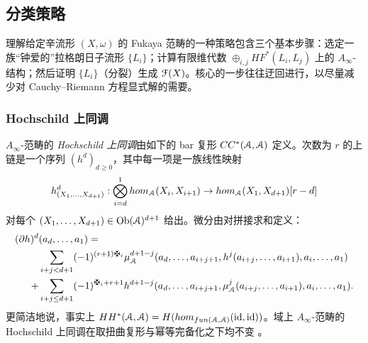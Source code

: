 
\subsection{分类策略}

理解给定辛流形 $(X,\omega)$ 的 Fukaya 范畴的一种策略包含三个基本步骤：选定一族“钟爱的”拉格朗日子流形 $\{L_i\}$；计算有限维代数 $\oplus_{i,j} HF^*(L_i, L_j)$ 上的 $A_{\infty}$-结构；然后证明 $\{L_i\}$（分裂）生成 $\EuScript{F}(X)$。核心的一步往往迂回进行，以尽量减少对 Cauchy--Riemann 方程显式解的需要。

\subsubsection{Hochschild 上同调}

$A_{\infty}$-范畴的 \emph{Hochschild 上同调}由如下的 bar 复形 $CC^*(\EuScript{A},\EuScript{A})$ 定义。次数为 $r$ 的上链是一个序列 $(h^d)_{d\geq 0}$，其中每一项是一族线性映射
\[
h^d_{(X_1,\ldots,X_{d+1})}: \bigotimes_{i=d}^1 hom_{\EuScript{A}}(X_i,X_{i+1}) \rightarrow hom_{\EuScript{A}}(X_1,X_{d+1})[r-d]
\]
对每个 $(X_1,\ldots,X_{d+1})\in \mathrm{Ob}(\EuScript{A})^{d+1}$ 给出。微分由对拼接求和定义：
\begin{equation} \label{Eqn:Hochschild}
\begin{aligned}
(\partial h)^d & (a_d,\ldots, a_1) = \\
& \sum_{i+j<d+1} (-1)^{(r+1)\maltese_i} \mu_{\scrA}^{d+1-j}(a_d,\ldots,a_{i+j+1},h^j(a_{i+j},\ldots,a_{i+1}),a_{i},\ldots,a_1) \\
+ &  \sum_{i+j\leq d+1} (-1)^{\maltese_{i} +r +1}  h^{d+1-j} (a_d,\ldots,a_{i+j+1},\mu_{\scrA}^j(a_{i+j},\ldots,a_{i+1}),a_{i},\ldots,a_1).
\end{aligned}
\end{equation}
更简洁地说，事实上 $HH^*(\EuScript{A},\EuScript{A}) = H(hom_{fun(\EuScript{A},\EuScript{A})}(\mathrm{id},\mathrm{id}))$。域上 $A_{\infty}$-范畴的 Hochschild 上同调在取扭曲复形与幂等完备化之下均不变 \cite[Section 1c]{Seidel:Flux}。

